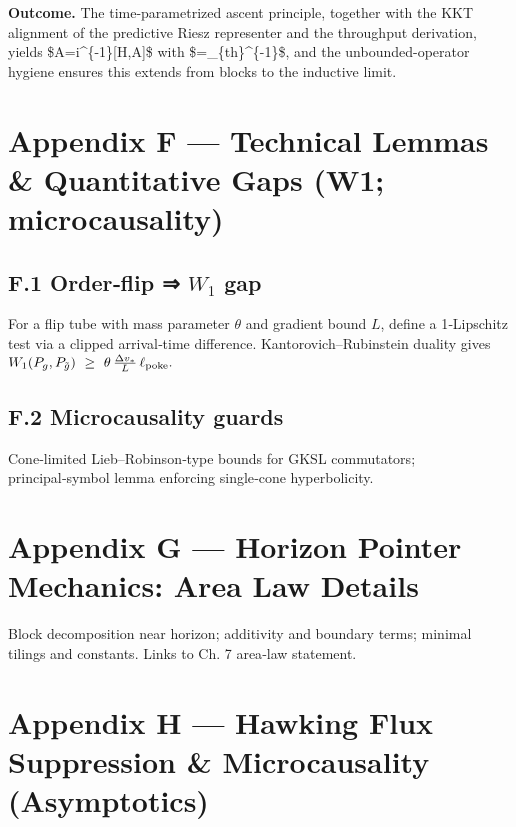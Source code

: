 \documentclass[
]{article}
\numberwithin{equation}{section}
\begin{document}
\textbf{Outcome.} The time-parametrized ascent principle, together with
the KKT alignment of the predictive Riesz representer and the throughput
derivation, yields \$\dot A=i\hbar\^{}\{-1\}{[}H,A{]}\$ with
\$\hbar=\lambda\_\{\rm th\}\^{}\{-1\}\$, and the unbounded-operator
hygiene ensures this extends from blocks to the inductive limit. 

\hypertarget{appendix-f-technical-lemmas-quantitative-gaps-w1-microcausality}{%
\section{Appendix F --- Technical Lemmas \& Quantitative Gaps (W1;
microcausality)}\label{appendix-f-technical-lemmas-quantitative-gaps-w1-microcausality}}

\hypertarget{f.1-orderflip-w_1-gap}{%
\subsection{\texorpdfstring{F.1 Order‑flip ⇒ \(W_1\)
gap}{F.1 Order‑flip ⇒ W\_1 gap}}\label{f.1-orderflip-w_1-gap}}

For a flip tube with mass parameter \(\theta\) and gradient bound \(L\),
define a 1‑Lipschitz test via a clipped arrival‑time difference.
Kantorovich--Rubinstein duality gives
\(W_1(P_g,P_{\tilde g})\ \ge\ \theta\,\frac{\Delta v_*}{L}\,\ell_{\rm poke}.\)

\hypertarget{f.2-microcausality-guards}{%
\subsection{F.2 Microcausality guards}\label{f.2-microcausality-guards}}

Cone‑limited Lieb--Robinson‑type bounds for GKSL commutators;
principal‑symbol lemma enforcing single‑cone hyperbolicity.

\hypertarget{appendix-g-horizon-pointer-mechanics-area-law-details}{%
\section{Appendix G --- Horizon Pointer Mechanics: Area Law
Details}\label{appendix-g-horizon-pointer-mechanics-area-law-details}}

Block decomposition near horizon; additivity and boundary terms; minimal
tilings and constants. Links to Ch. 7 area‑law statement.

\hypertarget{appendix-h-hawking-flux-suppression-microcausality-asymptotics}{%
\section{Appendix H --- Hawking Flux Suppression \& Microcausality
(Asymptotics)}\label{appendix-h-hawking-flux-suppression-microcausality-asymptotics}}
\end{document}
